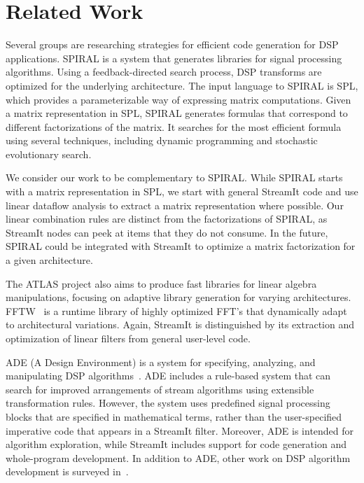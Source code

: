 \section{Related Work}
\label{sec:related}

Several groups are researching strategies for efficient code
generation for DSP applications.  SPIRAL is a system that generates
libraries for signal processing
algorithms\cite{spiral,johnson01searching,egner01automatic}.  Using a
feedback-directed search process, DSP transforms are optimized for the
underlying architecture.  The input language to SPIRAL is
SPL\cite{xiong01spl,xiong-thesis}, which provides a parameterizable
way of expressing matrix computations.  Given a matrix representation
in SPL, SPIRAL generates formulas that correspond to different
factorizations of the matrix.  It searches for the most efficient
formula using several techniques, including dynamic programming and
stochastic evolutionary search.

We consider our work to be complementary to SPIRAL.  While SPIRAL
starts with a matrix representation in SPL, we start with general
StreamIt code and use linear dataflow analysis to extract a matrix
representation where possible.  Our linear combination rules are
distinct from the factorizations of SPIRAL, as StreamIt nodes can peek
at items that they do not consume.  In the future, SPIRAL could be
integrated with StreamIt to optimize a matrix factorization for a
given architecture.

The ATLAS project \cite{whaley01automated} also aims to produce fast
libraries for linear algebra manipulations, focusing on adaptive
library generation for varying architectures.  FFTW~\cite{frigo99fast}
is a runtime library of highly optimized FFT's that dynamically adapt
to architectural variations.  Again, StreamIt is distinguished by its
extraction and optimization of linear filters from general user-level
code.

ADE (A Design Environment) is a system for specifying, analyzing, and
manipulating DSP algorithms~\cite{covell-ade}.  ADE includes a
rule-based system that can search for improved arrangements of stream
algorithms using extensible transformation rules.  However, the system
uses predefined signal processing blocks that are specified in
mathematical terms, rather than the user-specified imperative code
that appears in a StreamIt filter.  Moreover, ADE is intended for
algorithm exploration, while StreamIt includes support for code
generation and whole-program development.  In addition to ADE, other
work on DSP algorithm development is surveyed
in~\cite{oppenheim-symbolic}.


